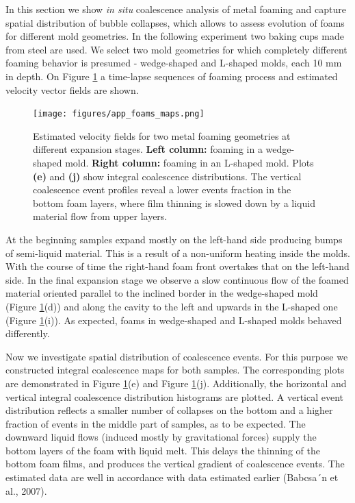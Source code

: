 In this section we show \textit{in situ} coalescence analysis of metal 
foaming and capture spatial distribution of bubble collapses, which allows to assess evolution of foams for different mold geometries. In the following experiment two baking cups made from steel are used. We select two mold geometries for which completely different foaming behavior is presumed - wedge-shaped and L-shaped molds, each 10 mm in depth. On Figure \ref{fig:app_foams_maps} a time-lapse sequences of foaming process and estimated velocity vector fields are shown. 
\begin{figure}[ht]
  \centerline{
    \mbox{\texttt{[image: figures/app\_foams\_maps.png]}}
  }
  \caption[]{Estimated velocity fields for two metal foaming geometries at different expansion stages. \textbf{Left column:} foaming in a wedge-shaped mold. \textbf{Right column:} foaming in an L-shaped mold. Plots \textbf{(e)} and \textbf{(j)} show integral coalescence distributions. The vertical coalescence event profiles reveal a lower events fraction in the bottom foam layers, where
film thinning is slowed down by a liquid material flow from upper layers.}
  \label{fig:app_foams_maps}
\end{figure}
At the beginning samples expand mostly on the left-hand
side producing bumps of semi-liquid material. This is a result of
a non-uniform heating inside the molds. With the
course of time the right-hand foam front overtakes that on the
left-hand side. In the final expansion stage we observe a slow
continuous flow of the foamed material oriented parallel to
the inclined border in the wedge-shaped mold (Figure \ref{fig:app_foams_maps}(d)) and along
the cavity to the left and upwards in the L-shaped one (Figure \ref{fig:app_foams_maps}(i)). As expected, foams in wedge-shaped and L-shaped molds behaved differently.


Now we investigate spatial distribution of coalescence events. For this purpose we constructed integral coalescence maps for both samples.
The corresponding plots are demonstrated in Figure \ref{fig:app_foams_maps}(e) and
Figure \ref{fig:app_foams_maps}(j). Additionally, the horizontal and vertical integral coalescence
distribution histograms are plotted. A vertical event distribution
reflects a smaller number of collapses on the bottom and a higher fraction of events in the middle part of samples, as to be expected. The downward liquid flows (induced mostly by gravitational forces) supply the bottom layers of the foam with liquid melt. This delays the thinning of the bottom foam films, and produces the vertical gradient of coalescence events. The estimated data
are well in accordance with data estimated earlier (Babcsa´n et al., 2007).


